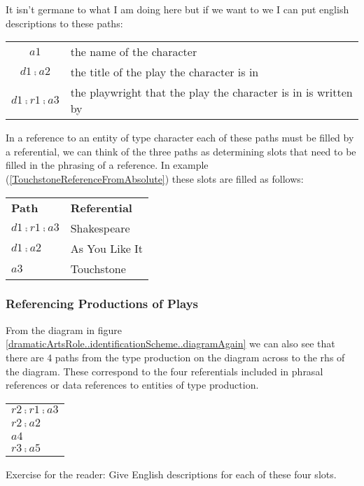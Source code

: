 It isn't germane to what I am doing here but if we want to we I can put english descriptions to these paths:
\begin{center}
\begin{tabular}{c p{8cm}}
$a1$ & the name of the character \\
$d1 \comp a2$ & the title of the play the character is in \\
$d1 \comp r1 \comp a3$ & the playwright that the play the character is in is written by 
\end{tabular}
\end{center} 

In a reference to an entity of type character each of these paths must be filled by a referential, 
we can think of the three paths as determining slots that need to be filled  in the phrasing of a reference. 
In example (\ref{TouchstoneReferenceFromAbsolute}) these slots are filled as follows:

\begin{tabular}{l l}
\textbf{Path}          & \textbf{Referential} \\
$d1 \comp r1 \comp a3$ & Shakespeare          \\
$d1 \comp a2$          & As You Like It       \\
$a3         $          & Touchstone
\end{tabular}

\subsubsection{Referencing Productions of Plays}

From the diagram in figure \ref{dramaticArtsRole..identificationScheme..diagramAgain} 
we can also see that there are 4 paths from the type production on the diagram
across to the rhs of the diagram. 
These correspond to the four referentials included in phrasal references or data references to entities of 
type production.
\begin{center}
\begin{tabular}{p{3cm}}
$r2 \comp r1 \comp a3$ \\
$r2 \comp a2$ \\
$a4$          \\
$r3 \comp a5$ \\
\end{tabular}
\end{center}

Exercise for the reader: Give English descriptions for each of these four slots. 

